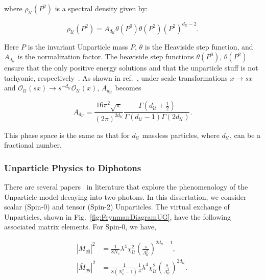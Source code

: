 where $\rho_{\mathcal{U}} (P^2)$ is a spectral density given by:

\begin{equation}
\rho_{\mathcal{U}} (P^2) = A_{d_{\mathcal{U}}} \theta(P^0)\theta(P^2)(P^2)^{d_{\mathcal{U}}-2}.
\end{equation}

Here $P$ is the invariant Unparticle mass $P$, $\theta$ is the Heaviside step function, and $ A_{d_{\mathcal{U}}} $ is the normalization factor. The heaviside step functions $\theta(P^0)$, $\theta(P^2)$ ensure that the only positive energy solutions and that the unparticle stuff is not tachyonic, respectively~\cite{Kenzie:2022nza}. As shown in ref.~\cite{Cheung:2007ap}, under scale transformations $x \rightarrow sx $ and 
$\mathcal{O}_{\mathcal{U}}(sx) \rightarrow s^{-d_{\mathcal{U}}}\mathcal{O}_{\mathcal{U}}(x)$, $ A_{d_{\mathcal{U}}} $ becomes

\begin{equation}
 A_{d_{\mathcal{U}}}= \frac{16\pi^2\sqrt{\pi}}{(2\pi)^{2d_{\mathcal{U}}}} \frac{\Gamma\left(d_{\mathcal{U}} + \frac{1}{2}\right)}{\Gamma\left(d_{\mathcal{U}} -1\right) \Gamma\left(2d_{\mathcal{U}}\right)}.
\end{equation}

This phase space is the same as that for $d_{\mathcal{U}}$ massless particles, where $d_{\mathcal{U}}$, can be a fractional number. 

\subsubsection{Unparticle Physics to Diphotons}

There are several papers~\cite{Kumar:2007af, Kumar:2008dn, Ask:2009pv} in literature that explore the phenomenology of the Unparticle model decaying into two photons. In this dissertation, we consider scalar (Spin-0) and tensor (Spin-2) Unparticles. The virtual exchange of Unparticles, shown in Fig.~\ref{fig:FeynmanDiagramUG}, have the following associated matrix elements. For Spin-0, we have,

\begin{equation}
\begin{align*}
     |\bar{M}_{q\bar{q}}|^2 &= \frac{1}{8N_c} \lambda^4 \chi^2_{\mathcal{U}} \left(\frac{s}{\Lambda^2_{\mathcal{U}}}\right)^{2d_{\mathcal{U}}-1}, \\
     |\bar{M}_{gg}|^2 &= \frac{1}{8\left(N^2_c-1\right)}\frac{1}{4} \lambda^4 \chi^2_{\mathcal{U}} \left(\frac{s}{\Lambda^2_{\mathcal{U}}}\right)^{2d_{\mathcal{U}}}.
\end{align*}
~\label{eq:Unparspin0Matrix}
\end{equation}

